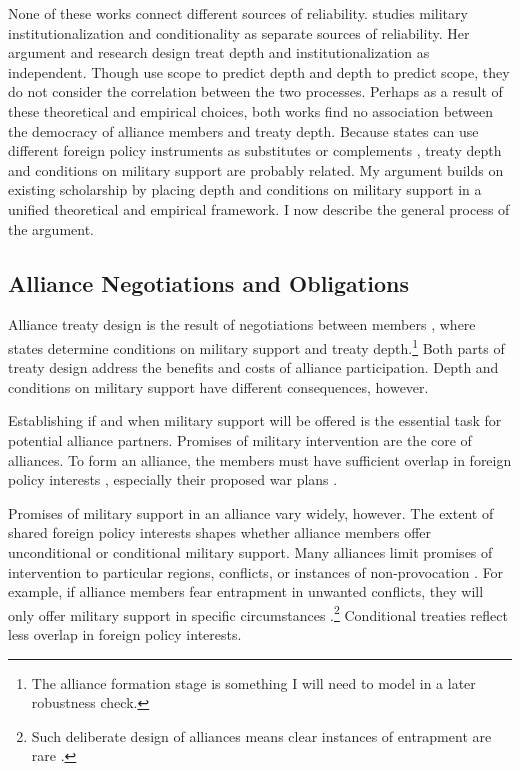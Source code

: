 \documentclass[12pt]{article}
\begin{document}
None of these works connect different sources of reliability.  
\citet{Mattes2012} studies military institutionalization and conditionality as separate sources of reliability. 
Her argument and research design treat depth and institutionalization as independent.
Though \citet{BensonClinton2016} use scope to predict depth and depth to predict scope, they do not consider the correlation between the two processes. 
Perhaps as a result of these theoretical and empirical choices, both works find no association between the democracy of alliance members and treaty depth. 
Because states can use different foreign policy instruments as substitutes or complements \citep{Starr2000, MorganPalmer2000}, treaty depth and conditions on military support are probably related. 
My argument builds on existing scholarship by placing depth and conditions on military support in a unified theoretical and empirical framework. 
I now describe the general process of the argument. 


\subsection{Alliance Negotiations and Obligations}


Alliance treaty design is the result of negotiations between members \citep{Poast2019a}, where states determine conditions on military support and treaty depth.\footnote{The alliance formation stage is something I will need to model in a later robustness check.}
Both parts of treaty design address the benefits and costs of alliance participation. 
Depth and conditions on military support have different consequences, however. 


Establishing if and when military support will be offered is the essential task for potential alliance partners. 
Promises of military intervention are the core of alliances. 
To form an alliance, the members must have sufficient overlap in foreign policy interests \citep{Morrow1991, Smith1995, FordhamPoast2014}, especially their proposed war plans \citep{Poast2019a}.  


Promises of military support in an alliance vary widely, however. 
The extent of shared foreign policy interests shapes whether alliance members offer unconditional or conditional military support.
Many alliances limit promises of intervention to particular regions, conflicts, or instances of non-provocation \citep{Leedsetal2000}. 
For example, if alliance members fear entrapment in unwanted conflicts, they will only offer military support in specific circumstances \citep{Kim2011, Benson2012}.\footnote{Such deliberate design of alliances means clear instances of entrapment are rare \citep{Kim2011, Beckley2015}.} 
Conditional treaties reflect less overlap in foreign policy interests. 
\end{document}
